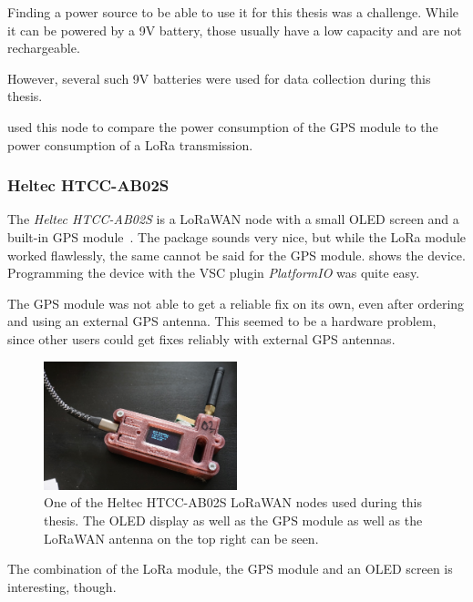 Finding a power source to be able to use it for this thesis was a challenge.
While it can be powered by a 9V battery, those usually have a low capacity and are not rechargeable.

However, several such 9V batteries were used for data collection during this thesis.

 used this node to compare the power consumption of the \ac{GPS} module to the power consumption of a \ac{LoRa} transmission.

\subsubsection{Heltec HTCC-AB02S}\label{subsubsec:heltec-htcc-ab02s}

The \emph{Heltec HTCC-AB02S} is a \ac{LoRaWAN} node with a small OLED screen and a built-in \ac{GPS} module~\cite{heltec_automation_cubecell_2020}.
The package sounds very nice, but while the \ac{LoRa} module worked flawlessly, the same cannot be said for the \ac{GPS} module.
 shows the device.
Programming the device with the \ac{VSC} plugin \emph{PlatformIO} was quite easy.

The \ac{GPS} module was not able to get a reliable fix on its own, even after ordering and using an external GPS antenna.
This seemed to be a hardware problem, since other users could get fixes reliably with external \ac{GPS} antennas.


\begin{figure}[htbp]
    \centering
    \includegraphics[width=0.5\textwidth]{pictures/hardware/gps-nodes/HTCC-AB02S.jpg}
    \caption{
        One of the Heltec HTCC-AB02S \ac{LoRaWAN} nodes used during this thesis.
        The \ac{OLED} display as well as the \ac{GPS} module as well as the \ac{LoRaWAN} antenna on the top right can be seen.
    }\label{pic:heltec-htcc-ab02s}
\end{figure}

The combination of the \ac{LoRa} module, the \ac{GPS} module and an \ac{OLED} screen is interesting, though.

